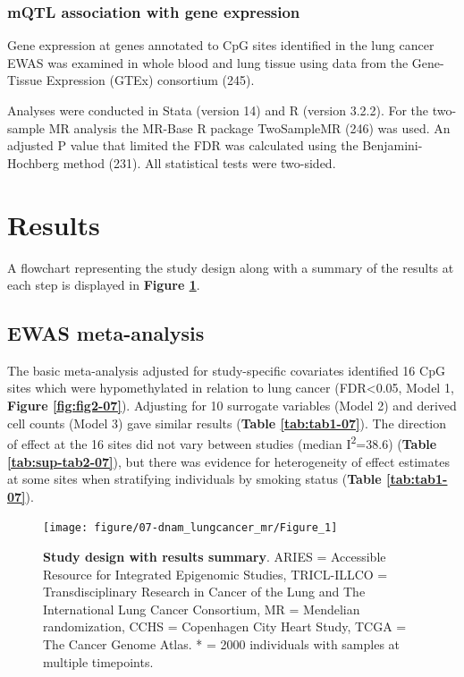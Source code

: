 \documentclass[11pt,twoside]{bristolthesis}
\newcommand{\blandscape}{\begin{landscape}}
\newcommand{\elandscape}{\end{landscape}}
\begin{document}
\hypertarget{mqtl-association-with-gene-expression}{%
\subsubsection{mQTL association with gene expression}\label{mqtl-association-with-gene-expression}}

Gene expression at genes annotated to CpG sites identified in the lung cancer EWAS was examined in whole blood and lung tissue using data from the Gene-Tissue Expression (GTEx) consortium (245).

Analyses were conducted in Stata (version 14) and R (version 3.2.2). For the two-sample MR analysis the MR-Base R package TwoSampleMR (246) was used. An adjusted P value that limited the FDR was calculated using the Benjamini-Hochberg method (231). All statistical tests were two-sided.

\hypertarget{results-07}{%
\section{Results}\label{results-07}}

A flowchart representing the study design along with a summary of the results at each step is displayed in \textbf{Figure \ref{fig:fig1-07}}.

\hypertarget{results-ewas-meta-analysis}{%
\subsection{EWAS meta-analysis}\label{results-ewas-meta-analysis}}

The basic meta-analysis adjusted for study-specific covariates identified 16 CpG sites which were hypomethylated in relation to lung cancer (FDR\textless0.05, Model 1, \textbf{Figure \ref{fig:fig2-07}}). Adjusting for 10 surrogate variables (Model 2) and derived cell counts (Model 3) gave similar results (\textbf{Table \ref{tab:tab1-07}}). The direction of effect at the 16 sites did not vary between studies (median I\textsuperscript{2}=38.6) (\textbf{Table \ref{tab:sup-tab2-07}}), but there was evidence for heterogeneity of effect estimates at some sites when stratifying individuals by smoking status (\textbf{Table \ref{tab:tab1-07}}).





\blandscape
\begin{figure}[htbp]

{\centering \texttt{[image: figure/07-dnam\_lungcancer\_mr/Figure\_1]} 

}

\caption[Study design with results summary]{\textbf{Study design with results summary}. ARIES = Accessible Resource for Integrated Epigenomic Studies, TRICL-ILLCO = Transdisciplinary Research in Cancer of the Lung and The International Lung Cancer Consortium, MR = Mendelian randomization, CCHS = Copenhagen City Heart Study, TCGA = The Cancer Genome Atlas. * = 2000 individuals with samples at multiple timepoints.}\label{fig:fig1-07}
\end{figure}
\elandscape
\end{document}
